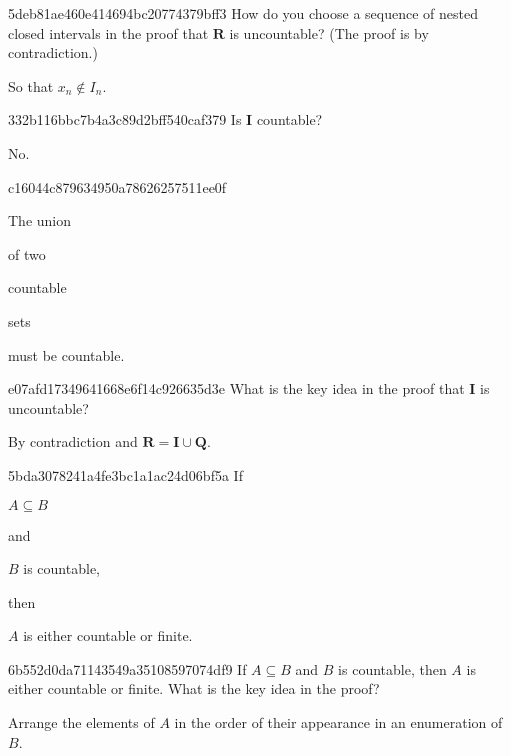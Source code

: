 \begin{note}{5deb81ae460e414694bc20774379bff3}
    How do you choose a sequence of nested closed intervals in the proof that \({ \mathbf{R} }\) is uncountable?
    (The proof is by contradiction.)

    \begin{cloze}{1}
        So that \({ x_{n} \not\in I_{n} }\).
    \end{cloze}
\end{note}

\begin{note}{332b116bbc7b4a3c89d2bff540caf379}
    Is \({ \mathbf{I} }\) countable?

    \begin{cloze}{1}
        No.
    \end{cloze}
\end{note}

\begin{note}{c16044c879634950a78626257511ee0f}
    \begin{icloze}{2}The union\end{icloze} of two \begin{icloze}{3}countable\end{icloze} sets \begin{icloze}{1}must be countable.\end{icloze}
\end{note}

\begin{note}{e07afd17349641668e6f14c926635d3e}
    What is the key idea in the proof that \({ \mathbf{I} }\) is uncountable?

    \begin{cloze}{1}
        By contradiction and \({ \mathbf{R} = \mathbf{I} \cup \mathbf{Q} }\).
    \end{cloze}
\end{note}

\begin{note}{5bda3078241a4fe3bc1a1ac24d06bf5a}
    If \begin{icloze}{3}\({ A \subseteq B }\)\end{icloze} and \begin{icloze}{2}\({ B }\) is countable,\end{icloze} then \begin{icloze}{1}\({ A }\) is either countable or finite.\end{icloze}
\end{note}

\begin{note}{6b552d0da71143549a35108597074df9}
    If \({ A \subseteq B }\) and \({ B }\) is countable, then \({ A }\) is either countable or finite.
    What is the key idea in the proof?

    \begin{cloze}{1}
        Arrange the elements of \({ A }\) in the order of their appearance in an enumeration of \({ B }\).
    \end{cloze}
\end{note}

